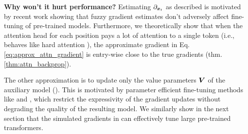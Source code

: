 \textbf{Why won't it hurt performance?} Estimating $\partial_{{\bm{x}}_t}$ as described is motivated by recent work \citep{malladi2023finetuning} showing that fuzzy gradient estimates don't adversely affect fine-tuning of pre-trained models. Furthermore, we theoretically show that when the attention head for each position pays a lot of attention to a single token (i.e., behaves like hard attention \citep{perez2021attention}), the approximate gradient in Eq. \ref{eq:approx_attn_gradient} is entry-wise close to the true gradients (thm. \ref{thm:attn_backprop}).

The other approximation is to update only the value parameters ${\bm{V}}$ of the auxiliary model (\textsection{\ref{sec:self-attnt-backprop_appendix}}). 
This is motivated by parameter efficient fine-tuning methods like \lora{} \cite{hu2021lora} and \ia{} \cite{liu2022few}, which restrict the expressivity of the gradient updates without degrading the quality of the resulting model.
We similarly show in the next section that the simulated gradients in \simulator{} can effectively tune large pre-trained transformers.
